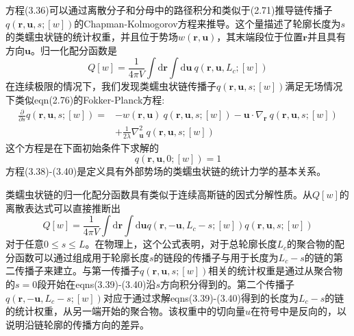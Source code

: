 方程(3.36)可以通过离散分子和分母中的路径积分和类似于(2.71)推导链传播子$q(\mathbf{r},\mathbf{u},s;[w])$的Chapman-Kolmogorov方程来推导。这个量描述了轮廓长度为$s$的类蠕虫状链的统计权重，并且位于势场$w(\mathbf{r},\mathbf{u})$，其末端段位于位置$\mathbf{r}$并且具有方向$\mathbf{u}$。归一化配分函数是
\begin{equation}
Q[w]=\frac{1}{4\pi V}\int\mathrm{d}\mathbf{r}\int\mathrm{d}\mathbf{u}~q(\mathbf{r},\mathbf{u},L_c;[w])
\end{equation}
在连续极限的情况下，我们发现类蠕虫状链传播子$q(\mathbf{r},\mathbf{u},s;[w])$满足无场情况下类似eqn(2.76)的Fokker-Planck方程:
\begin{equation}
\begin{aligned}
\frac{\partial}{\partial s}q(\mathbf{r},\mathbf{u},s;[w])=&-w(\mathbf{r},\mathbf{u})~q(\mathbf{r},\mathbf{u},s;[w])-\mathbf{u}\cdot\nabla_{\mathbf{r}}~q(\mathbf{r},\mathbf{u},s;[w])\\
&+\frac{1}{2\lambda}\nabla_{\mathbf{u}}^2~q(\mathbf{r},\mathbf{u},s;[w])
\end{aligned}
\end{equation}
这个方程是在下面初始条件下求解的
\begin{equation}
q(\mathbf{r},\mathbf{u},0;[w])=1
\end{equation}
方程(3.38)-(3.40)是定义具有外部势场的类蠕虫状链的统计力学的基本关系。

类蠕虫状链的归一化配分函数具有类似于连续高斯链的因式分解性质。从$Q[w]$的离散表达式可以直接推断出
\begin{equation}
Q[w]=\frac{1}{4\pi V}\int\mathrm{d}\mathbf{r}\int\mathrm{d}\mathbf{u}q(\mathbf{r},-\mathbf{u},L_c-s;[w])q(\mathbf{r},\mathbf{u},s;[w])
\end{equation}
对于任意$0\le s\le L$。在物理上，这个公式表明，对于总轮廓长度$L_c$的聚合物的配分函数可以通过组成用于轮廓长度$s$的链段的传播子与用于长度为$L_c-s$的链的第二传播子来建立。与第一传播子$q(\mathbf{r},\mathbf{u},s;[w])$相关的统计权重是通过从聚合物的$s=0$段开始在eqns(3.39)-(3.40)沿$s$方向积分得到的。第二个传播子$q(\mathbf{r},-\mathbf{u},L_c-s;[w])$对应于通过求解eqns(3.39)-(3.40)得到的长度为$L_c-s$的链的统计权重，从另一端开始的聚合物。该权重中的切向量$u$在符号中是反向的，以说明沿链轮廓的传播方向的差异。

